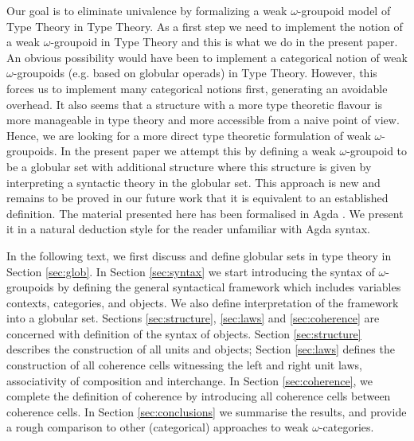 Our goal is to eliminate univalence by formalizing a weak
$\omega$-groupoid model of Type Theory in Type Theory.  As a first
step we need to implement the notion of a weak $\omega$-groupoid in
Type Theory and this is what we do in the present paper.  An obvious
possibility would have been to implement a categorical notion of weak
$\omega$-groupoids (e.g. based on globular operads) in Type
Theory. However, this forces us to implement many categorical notions
first,  generating an avoidable overhead. It also seems that a structure
with a more type theoretic flavour is more manageable in type theory
and more accessible from a naive point of view. Hence, we are looking
for a more direct type theoretic formulation of weak
$\omega$-groupoids. In the present paper we attempt this by defining a
weak $\omega$-groupoid to be a globular set with additional structure
where this structure is given by interpreting a syntactic theory in
the globular set. This approach is new and remains to be proved in our
future work that it is equivalent to an established definition. The
material presented here has been formalised in Agda \cite{agda}. We
present it in a natural deduction style for the reader unfamiliar with
Agda syntax.

In the following text, we first discuss and define globular sets in
type theory in Section \ref{sec:glob}. In Section \ref{sec:syntax} we
start introducing the syntax of $\omega$-groupoids by defining the general
syntactical framework which includes variables contexts, categories,
and objects. We also define interpretation of the framework into a
globular set. Sections \ref{sec:structure}, \ref{sec:laws} and
\ref{sec:coherence} are concerned with definition of the syntax of
objects. Section \ref{sec:structure} describes the construction of all
units and objects; Section \ref{sec:laws} defines the construction of
all coherence cells witnessing the left and right unit laws,
associativity of composition and interchange. In Section
\ref{sec:coherence}, we complete the definition of coherence by
introducing all coherence cells between coherence cells. In Section
\ref{sec:conclusions}  we summarise the results, and provide a rough
comparison to other (categorical) approaches to weak
$\omega$-categories. 



